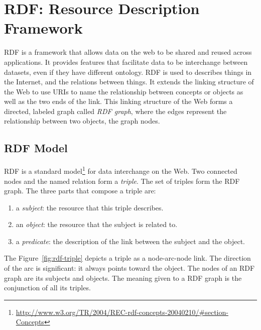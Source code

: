 \section{RDF: Resource Description Framework}

RDF is a framework that allows data on the web to be shared and reused across
applications. It provides features that facilitate data to be interchange
between datasets, even if they have different ontology.
RDF is used to describes things in the Internet, and the relations between
things. It extends the linking structure of the Web to use URIs to name the
relationship between concepts or objects as well as the two ends of the link.
This linking structure of the Web forms a directed, labeled graph called
\emph{RDF graph}, where the edges represent the relationship between two
objects, the graph nodes.

\subsection{RDF Model}

RDF is a standard
model\footnote{\url{http://www.w3.org/TR/2004/REC-rdf-concepts-20040210/\#section-Concepts}}
for data interchange on the Web. Two connected nodes and the named relation
form a \emph{triple}. The set of triples form the RDF graph. The three parts
that compose a triple are:
\begin{enumerate}
  \item a \emph{subject}: the resource that this triple describes.
  \item an \emph{object}: the resource that the subject is related to.
  \item a \emph{predicate}: the description of the link between the subject and
  the object.
\end{enumerate}
The Figure~\ref{fig:rdf-triple} depicts a triple as a node-arc-node
link. The direction of the arc is significant: it always points toward the
object. The nodes of an RDF graph are its subjects and objects. The meaning
given to a RDF graph is the conjunction of all its triples.


